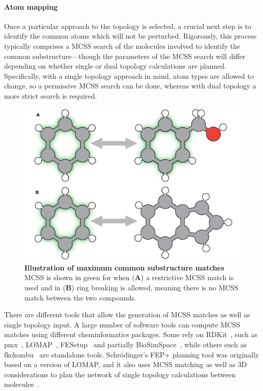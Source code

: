 \documentclass[9pt,bestpractices]{livecoms}
\begin{document}
\paragraph{Atom mapping}
Once a particular approach to the topology is selected, a crucial next step is to identify the common atoms which will not be perturbed.
Rigorously, this process typically comprises a MCSS search of the molecules involved to identify the common substructure---though the parameters of the MCSS search will differ depending on whether single or dual topology calculations are planned.
Specifically, with a single topology approach in mind, atom types are allowed to change, so a permissive MCSS search can be done, whereas with dual topology a more strict search is required.
\begin{figure}
    \includegraphics[width=0.95\linewidth]{figures/fig4_mcs/Figure.pdf}
    \caption{\textbf{Illustration of maximum common substructure matches} MCSS is shown in green for when (\textbf{A}) a restrictive MCSS match is used and in (\textbf{B}) ring breaking is allowed, meaning there is no MCSS match between the two compounds.}
    \label{fig:fig_mcss}
\end{figure} 

There are different tools that allow the generation of MCSS matches as well as single topology input. A large number of software tools can compute MCSS matches using different cheminformatics packages. Some rely on RDKit~\cite{rdkit2019Dec}, such as pmx~\cite{gapsys2015pmx}, LOMAP~\cite{liu2013lead}, FESetup~\cite{loeffler2015fesetup} and partially BioSimSpace~\cite{hedges2019biosimspace}, while others such as fkckombu~\cite{kawabata20143d} are standalone tools. Schr\"{o}dinger's FEP+ planning tool was originally based on a version of LOMAP, and it also uses MCSS matching as well as 3D considerations to plan the network of single topology calculations between molecules~\cite{wang2015accurate}. 
\end{document}

